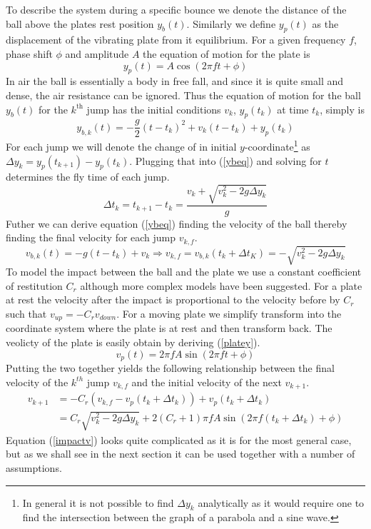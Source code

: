 \documentclass[12pt,oneside,a4paper]{article}
\numberwithin{equation}{section}
\begin{document}
{{{{To describe the system during a specific bounce we denote the distance of the ball above the plates rest position $y_b(t)$. Similarly we define $y_p(t)$ as the displacement of the vibrating  plate from it equilibrium. For a given frequency $f$, phase shift $\phi$ and amplitude $A$ the equation of motion for the plate is
\begin{equation}
	y_p(t)= A \cos(2\pi f t+ \phi)
	\label{platey}
\end{equation}
In air the ball is essentially a body in free fall, and since it is quite small and dense, the air resistance can be ignored. Thus the equation of motion for the ball $y_b(t)$ for the $k^\text{th}$ jump has the initial conditions $v_k$, $y_p(t_k)$ at time $t_k$, simply is
\begin{equation}
	y_{b,k}(t) = -\frac{g}{2}(t-t_k)^2+v_k(t-t_k)+y_p(t_k)
	\label{ybeq}
\end{equation}
For each jump we will denote the change of in initial $y$-coordinate\footnote{In general it is not possible to find $\Delta y_k$ analytically as it would require one to find the intersection between the graph of a parabola and a sine wave.} as $\Delta y_{k}=y_p(t_{k+1})-y_p(t_{k})$. Plugging that into (\ref{ybeq}) and solving for $t$ determines the fly time of each jump.
\begin{equation}
	\Delta t_{k} = t_{k+1}-t_{k} = \frac{v_{k}+\sqrt{v_k^2-2g\Delta y_k}}{g}
	\label{flytime}
\end{equation}
Futher we can derive equation (\ref{ybeq}) finding the velocity of the ball thereby finding the final velocity for each jump $v_{k,f}$.
\begin{equation}
	v_{b,k}(t) = -g(t-t_k)+v_k \Rightarrow v_{k,f} = v_{b,k}(t_k+\Delta t_K) = -\sqrt{v_k^2-2g\Delta y_k}
\end{equation}
To model the impact between the ball and the plate we use a constant coefficient of restitution $C_r$ although more complex models have been suggested. For a plate at rest the velocity after the impact is proportional to the velocity before by $C_r$ such that $v_{up}=-C_r v_{down}$. For a moving plate we simplify transform into the coordinate system where the plate is at rest and then transform back. The veolicty of the plate is easily obtain by deriving (\ref{platey}).
\begin{equation}
	v_p(t) = 2\pi f A \sin(2\pi f t+ \phi)
	\label{platev}
\end{equation}
Putting the two together yields the following relationship between the final velocity of the $k^{th}$ jump $v_{k,f}$ and the initial velocity of the next $v_{k+1}$.
\begin{align}
	v_{k+1} &= -C_r(v_{k,f}-v_p(t_k+\Delta t_k))+v_p(t_k+\Delta t_k) \nonumber \\
	&= C_r \sqrt{v_k^2-2g\Delta y_k}+2(C_r+1)\pi f A \sin(2\pi f (t_k+\Delta t_k)+ \phi) \label{impactv}
\end{align}
Equation (\ref{impactv}) looks quite complicated as it is for the most general case, but as we shall see in the next section it can be used together with a number of assumptions.

}}}}
\end{document}
